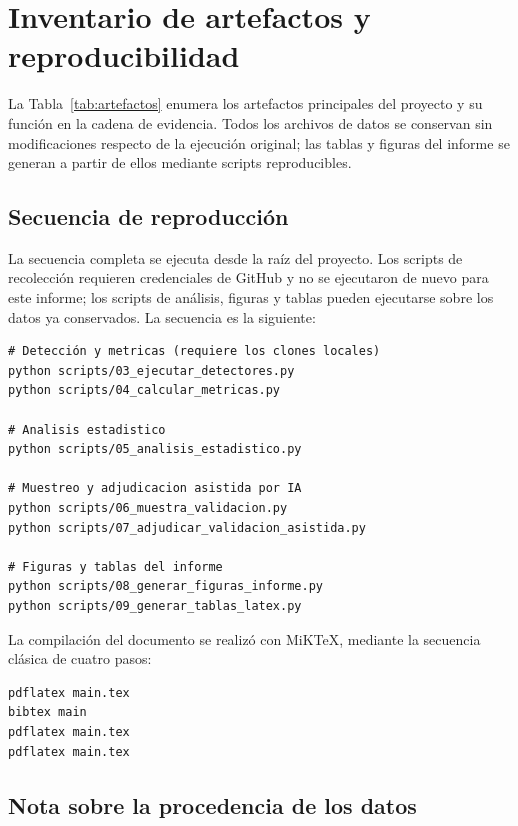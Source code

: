 \appendix

\section{Inventario de artefactos y reproducibilidad}

La Tabla~\ref{tab:artefactos} enumera los artefactos principales del proyecto y su función en la cadena de evidencia. Todos los archivos de datos se conservan sin modificaciones respecto de la ejecución original; las tablas y figuras del informe se generan a partir de ellos mediante scripts reproducibles.



\subsection{Secuencia de reproducción}

La secuencia completa se ejecuta desde la raíz del proyecto. Los scripts de recolección requieren credenciales de GitHub y no se ejecutaron de nuevo para este informe; los scripts de análisis, figuras y tablas pueden ejecutarse sobre los datos ya conservados. La secuencia es la siguiente:

\begin{verbatim}
# Detección y metricas (requiere los clones locales)
python scripts/03_ejecutar_detectores.py
python scripts/04_calcular_metricas.py

# Analisis estadistico
python scripts/05_analisis_estadistico.py

# Muestreo y adjudicacion asistida por IA
python scripts/06_muestra_validacion.py
python scripts/07_adjudicar_validacion_asistida.py

# Figuras y tablas del informe
python scripts/08_generar_figuras_informe.py
python scripts/09_generar_tablas_latex.py
\end{verbatim}

La compilación del documento se realizó con MiKTeX, mediante la secuencia clásica de cuatro pasos:

\begin{verbatim}
pdflatex main.tex
bibtex main
pdflatex main.tex
pdflatex main.tex
\end{verbatim}

\subsection{Nota sobre la procedencia de los datos}

